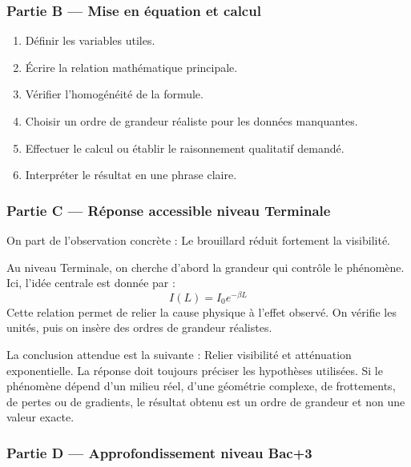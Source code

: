 \documentclass[11pt,a4paper]{article}
\begin{document}
\subsubsection*{Partie B — Mise en équation et calcul}

\begin{enumerate}
  \item Définir les variables utiles.
  \item Écrire la relation mathématique principale.
  \item Vérifier l'homogénéité de la formule.
  \item Choisir un ordre de grandeur réaliste pour les données manquantes.
  \item Effectuer le calcul ou établir le raisonnement qualitatif demandé.
  \item Interpréter le résultat en une phrase claire.
\end{enumerate}

\subsubsection*{Partie C — Réponse accessible niveau Terminale}

\begin{corrigebox}
On part de l'observation concrète : Le brouillard réduit fortement la visibilité.

Au niveau Terminale, on cherche d'abord la grandeur qui contrôle le phénomène. Ici, l'idée centrale est donnée par :
\[
I(L)=I_0e^{-\beta L}
\]
Cette relation permet de relier la cause physique à l'effet observé. On vérifie les unités, puis on insère des ordres de grandeur réalistes.

La conclusion attendue est la suivante : Relier visibilité et atténuation exponentielle. La réponse doit toujours préciser les hypothèses utilisées. Si le phénomène dépend d'un milieu réel, d'une géométrie complexe, de frottements, de pertes ou de gradients, le résultat obtenu est un ordre de grandeur et non une valeur exacte.
\end{corrigebox}

\subsubsection*{Partie D — Approfondissement niveau Bac+3}
\end{document}

